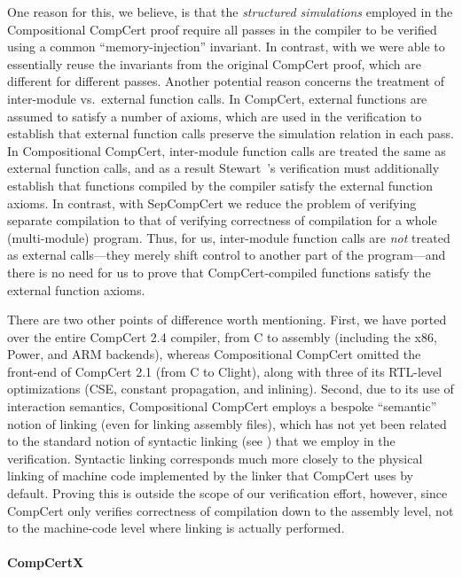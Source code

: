 One reason for this, we believe, is that the \emph{structured
  simulations} employed in the Compositional CompCert proof require
all passes in the compiler to be verified using a common
``memory-injection'' invariant.  In contrast, with \sepcomp{} we were
able to essentially reuse the invariants from the original CompCert
proof, which are different for different passes.  Another potential
reason concerns the treatment of inter-module vs.\ external function
calls.  In CompCert, external functions are assumed to satisfy a
number of axioms, which are used in the verification to establish that
external function calls preserve the simulation relation in each pass.
In Compositional CompCert, inter-module function calls are treated the
same as external function calls, and as a result Stewart~\etal's
verification must additionally establish that functions compiled by
the compiler satisfy the external function axioms.  In contrast, with
SepCompCert we reduce the problem of verifying separate compilation to
that of verifying correctness of compilation for a whole
(multi-module) program.  Thus, for us, inter-module function calls are
\emph{not} treated as external calls---they merely shift control to
another part of the program---and there is no need for us to prove
that CompCert-compiled functions satisfy the external function axioms.

There are two other points of difference worth mentioning.  First, we
have ported over the entire CompCert 2.4 compiler, from C to assembly
(including the x86, Power, and ARM backends), whereas Compositional
CompCert omitted the front-end of CompCert 2.1 (from C to Clight),
along with three of its RTL-level optimizations (CSE, constant
propagation, and inlining).  Second, due to its use of interaction
semantics, Compositional CompCert employs a bespoke ``semantic''
notion of linking (even for linking assembly files), which has not yet
been related to the standard notion of syntactic linking (see
) that we employ in the \sepcomp{}
verification.  Syntactic linking corresponds much more closely to the
physical linking of machine code implemented by the  linker
that CompCert uses by default.  Proving this is outside the scope of
our verification effort, however, since CompCert only verifies
correctness of compilation down to the assembly level, not to the
machine-code level where linking is actually performed.

\paragraph{CompCertX}

